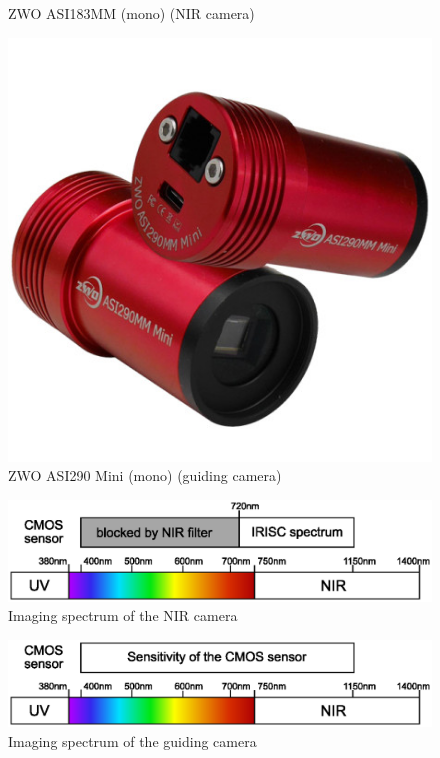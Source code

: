 \begin{figure}[h]
\begin{minipage}[t]{0.3\linewidth}
		\caption{ZWO ASI183MM (mono) (NIR camera)}
		\label{fig::4.1-sensor}
	\end{minipage}
	\hspace{0.03\linewidth}
	\begin{minipage}[t]{0.3\linewidth}
		\centering
		\includegraphics[width=0.7\linewidth]{4-experiment-design/img/setup/ZWO_ASI290MM_Mini}
		\caption{ZWO ASI290 Mini (mono) (guiding camera)}
		\label{fig::4.1-guiding_camera}
	\end{minipage}

\end{figure}

\begin{figure}[H]
	\centering
	\includegraphics[width=0.8\linewidth]{4-experiment-design/img/setup/IRISC_spectrum}
	\caption{Imaging spectrum of the NIR camera}
	\label{fig::4.1-NIR_spectrum}
\end{figure}

\begin{figure}[H]
	\centering
	\includegraphics[width=0.8\linewidth]{4-experiment-design/img/setup/CMOS_spectrum}
	\caption{Imaging spectrum of the guiding camera}
	\label{fig::4.1-CMOS_spectrum}
\end{figure}

